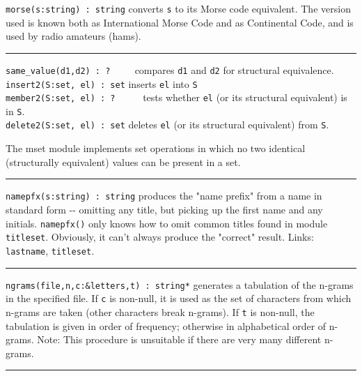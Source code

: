 \texttt{morse(s:string) : string} converts \texttt{s} to its
Morse code equivalent. The version used is known both
as International Morse Code and as Continental Code, and is used by
radio amateurs (hams).

\vspace{0.25cm}\hrule{}

\texttt{same\_value(d1,d2) : ? \ }\ \ \ compares \texttt{d1} and
\texttt{d2} for structural equivalence.\\
\texttt{insert2(S:set, el) : set} inserts \texttt{el} into \texttt{S}
\\
\texttt{member2(S:set, el) : ?} \ \ \ \ \ tests whether \texttt{el} (or
its structural equivalent) is in \texttt{S}.\\
\texttt{delete2(S:set, el) : set} deletes \texttt{el} (or its structural
equivalent) from \texttt{S}.

The mset module implements set operations in which no two identical
(structurally equivalent) values can be present in a set.

\vspace{0.25cm}\hrule{}

\texttt{namepfx(s:string) : string} produces the "name
prefix" from a name in standard form -{}- omitting any
title, but picking up the first name and any initials.
\texttt{namepfx()} only knows how to omit common titles found in module
\texttt{titleset}. Obviously, it can't always produce
the "correct" result. Links:
\texttt{lastname}, \texttt{titleset}. 

\vspace{0.25cm}\hrule{}

\texttt{ngrams(file,n,c:\&letters,t) : string*} generates a tabulation
of the n-grams in the specified file. If \texttt{c} is non-null, it is
used as the set of characters from which n-grams are
taken (other characters break n-grams). If \texttt{t} is non-null, the
tabulation is given in order of frequency; otherwise in alphabetical
order of n-grams. Note: This procedure is unsuitable if there are very
many different n-grams. 

\vspace{0.25cm}\hrule{}

